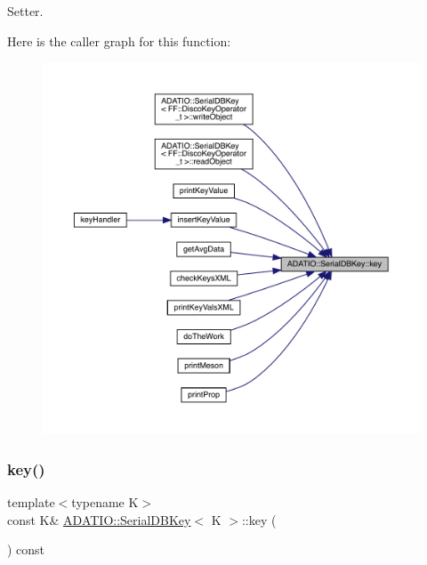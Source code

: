 Setter. 

Here is the caller graph for this function\+:
\nopagebreak
\begin{figure}[H]
\begin{center}
\leavevmode
\includegraphics[width=350pt]{d1/deb/classADATIO_1_1SerialDBKey_a9dc566bd8bc83d98d4438d220012648a_icgraph}
\end{center}
\end{figure}
\mbox{\label{classADATIO_1_1SerialDBKey_a89514c7decfe6ee0573032faff49703a}} 
\subsubsection{\texorpdfstring{key()}{key()}\hspace{0.1cm}{\footnotesize\ttfamily [4/6]}}
{\footnotesize\ttfamily template$<$typename K$>$ \\
const K\& \mbox{\hyperlink{classADATIO_1_1SerialDBKey}{A\+D\+A\+T\+I\+O\+::\+Serial\+D\+B\+Key}}$<$ K $>$\+::key (\begin{DoxyParamCaption}{ }\end{DoxyParamCaption}) const\hspace{0.3cm}{\ttfamily [inline]}}



